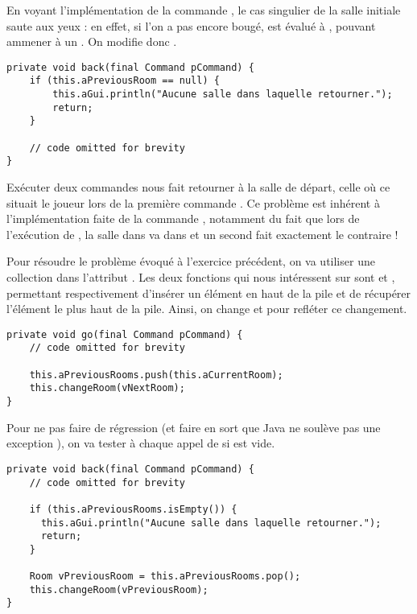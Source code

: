 \begin{exercise}[subtitle=Test de la commande back]

En voyant l'implémentation de la commande , le cas singulier de la salle initiale saute aux yeux : en effet, si l'on a pas encore bougé,  est évalué à , pouvant ammener à un . On modifie donc .

\begin{verbatim}
private void back(final Command pCommand) {
    if (this.aPreviousRoom == null) {
        this.aGui.println("Aucune salle dans laquelle retourner.");
        return;
    }
    
    // code omitted for brevity
}
\end{verbatim}
\end{exercise}

\begin{exercise}[subtitle=back back]

Exécuter deux commandes  nous fait retourner à la salle de départ, celle où ce situait le joueur lors de la première commande . Ce problème est inhérent à l'implémentation faite de la commande , notamment du fait que lors de l'exécution de , la salle dans  va dans  et un second  fait exactement le contraire !

\end{exercise}

\begin{exercise}[subtitle=Stack]

Pour résoudre le problème évoqué à l'exercice précédent, on va utiliser une collection  dans l'attribut . Les deux fonctions qui nous intéressent sur  sont  et , permettant respectivement d'insérer un élément en haut de la pile et de récupérer l'élément le plus haut de la pile. Ainsi, on change  et  pour refléter ce changement.

\begin{verbatim}
private void go(final Command pCommand) {
    // code omitted for brevity
    
    this.aPreviousRooms.push(this.aCurrentRoom);
    this.changeRoom(vNextRoom);
}
\end{verbatim}

Pour ne pas faire de régression (et faire en sort que Java ne soulève pas une exception ), on va tester à chaque appel de  si  est vide.

\begin{verbatim}
private void back(final Command pCommand) {
    // code omitted for brevity
    
    if (this.aPreviousRooms.isEmpty()) {
      this.aGui.println("Aucune salle dans laquelle retourner.");
      return;
    }
    
    Room vPreviousRoom = this.aPreviousRooms.pop();
    this.changeRoom(vPreviousRoom);
}
\end{verbatim}
\end{exercise}

